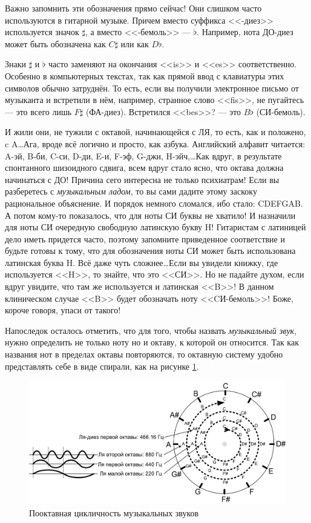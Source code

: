 Важно запомнить эти обозначения прямо сейчас! Они слишком часто используются в гитарной музыке. Причем вместо суффикса <<-диез>> используется значок $\sharp$, а вместо <<-бемоль>> --- $\flat$. Например, нота ДО-диез может быть обозначена как $C\sharp$ или как $D\flat$.

Знаки $\sharp$ и $\flat$ часто заменяют на окончания <<is>> и <<es>> соответственно. Особенно в компьютерных текстах, так как прямой ввод с клавиатуры этих символов обычно затруднён. То есть, если вы получили электронное письмо от музыканта и встретили в нём, например, странное слово <<fis>>, не пугайтесь --- это всего лишь $F\sharp$ (ФА-диез). Встретился <<bes>>? --- это $B\flat$ (СИ-бемоль).

\begin{Example}
    И жили они, не тужили с октавой, начинающейся с ЛЯ, то есть, как и положено, c A\ldots Ага, вроде всё логично и просто, как азбука. Английский алфавит читается: A-эй, B-би, C-си, D-ди, E-и, F-эф, G-джи, H-эйч,\ldots Как вдруг, в результате спонтанного шизоидного сдвига, всем вдруг стало ясно, что октава должна начинаться с ДО! Причина сего интересна не только психиатрам! Если вы разберетесь с \emph{музыкальным ладом}, то вы сами дадите этому заскоку рациональное объяснение. И порядок немного сломался, ибо стало: CDEFGAB. А потом кому-то показалось, что для ноты СИ буквы не хватило! И назначили для ноты СИ очередную свободную латинскую букву H! Гитаристам с латиницей дело иметь придется часто, поэтому запомните приведенное соответствие и будьте готовы к тому, что для обозначения ноты СИ может быть использована латинская буква H. Всё даже чуть сложнее\ldots Если вы увидели книжку, где используется <<H>>, то знайте, что это <<СИ>>. Но не падайте духом, если вдруг увидите, что там же используется и латинская <<B>>! В данном клиническом случае <<B>> будет обозначать ноту <<CИ-бемоль>>! Боже, короче говоря, упаси от такого!
\end{Example}

Напоследок осталось отметить, что для того, чтобы назвать \emph{музыкальный звук}, нужно определить не только ноту но и октаву, к которой он относится. Так как названия нот в пределах октавы повторяются, то октавную систему удобно представлять себе в виде спирали, как на рисунке \ref{fig:notes:names:octave}.

\begin{figure}[!ht]
    \centering
    \includegraphics{fig/intervals/octave-spiral} 
    \caption{Пооктавная цикличность музыкальных звуков}\label{fig:notes:names:octave}
\end{figure} 

